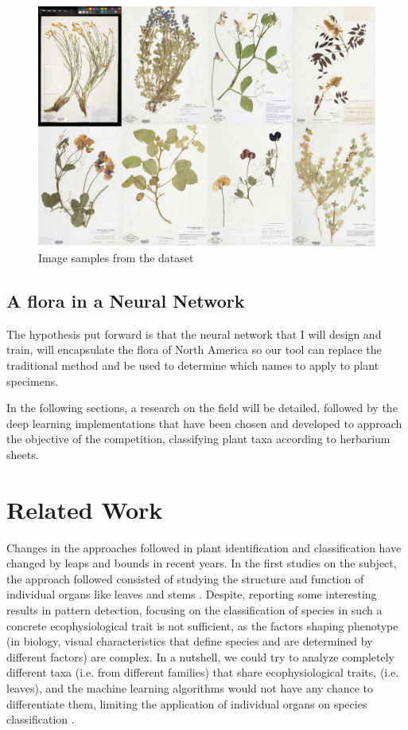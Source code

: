 \documentclass{article}
\begin{document}
\begin{figure}[h]
    \centering
    \includegraphics[width=13cm]{plants}
    \caption{Image samples from the dataset}
    \label{fig:plants}
\end{figure}

\subsection{A flora in a Neural Network}

The hypothesis put forward is that the neural network that I will design and train, will encapsulate the flora of North America so our tool can replace the traditional method and be used to determine which names to apply to plant specimens. 

In the following sections, a research on the field will be detailed, followed by the deep learning implementations that have been chosen and developed to approach the objective of the competition, classifying plant taxa according to herbarium sheets.

\section{Related Work}\label{relwork}

Changes in the approaches followed in plant identification and classification have changed by leaps and bounds in recent years. In the first studies on the subject, the approach followed consisted of studying the structure and function of individual organs like leaves and stems \cite{leafvein}. Despite, reporting some interesting results in pattern detection, focusing on the classification of species in such a concrete ecophysiological trait is not sufficient, as the factors shaping phenotype (in biology, visual characteristics that define species and are determined by different factors) are complex. In a nutshell, we could try to analyze completely different taxa (i.e. from different families) that share ecophysiological traits, (i.e. leaves), and the machine learning algorithms would not have any chance to differentiate them, limiting the application of individual organs on species classification \cite{frontiersplants}. 
\end{document}
